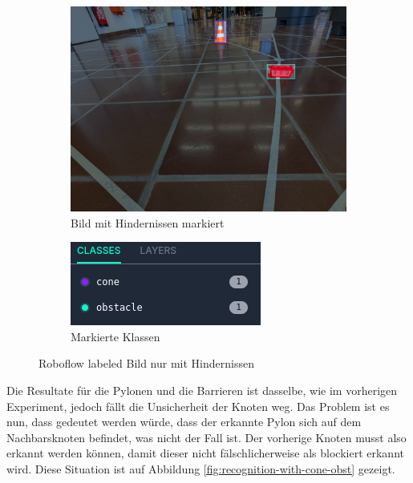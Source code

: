 \begin{figure}[H]
\centering
\begin{subfigure}{0.55\textwidth}
\centering
\includegraphics[width=0.95\linewidth]{assets/informatik-prototyp/yolo/label-cone-obstacle.png} 
\caption{Bild mit Hindernissen markiert}
\label{fig:labeled-image-obst}
\end{subfigure}
\begin{subfigure}{0.4\textwidth}
\centering
\includegraphics[width=0.95\linewidth]{assets/informatik-prototyp/yolo/classes-cone-obstacle.png} 
\caption{Markierte Klassen}
\label{fig:cone-obst-classes}
\end{subfigure}
\caption{Roboflow labeled Bild nur mit Hindernissen}
\label{fig:labeling-with-cone-obst}
\end{figure}


Die Resultate für die Pylonen und die Barrieren ist dasselbe, wie im vorherigen Experiment, jedoch fällt die Unsicherheit der Knoten weg. Das Problem ist es nun, dass gedeutet werden würde, dass der erkannte Pylon sich auf dem Nachbarsknoten befindet, was nicht der Fall ist. Der vorherige Knoten musst also erkannt werden können, damit dieser nicht fälschlicherweise als blockiert erkannt wird. Diese Situation ist auf Abbildung \ref{fig:recognition-with-cone-obst} gezeigt.


